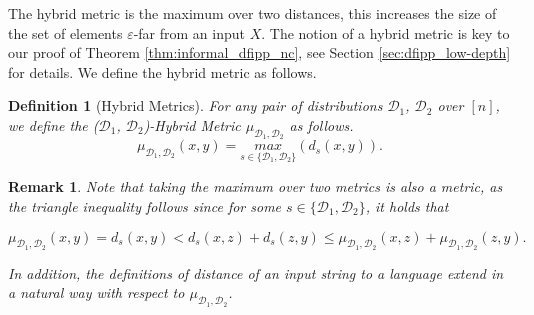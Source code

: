 \documentclass[10pt,a4paper]{article}
\newtheorem{definition}{Definition}[section]
\newtheorem{remark}{Remark}
\newcommand{\sD}{\mathcal{D}}
\begin{document}
The hybrid metric is the maximum over two distances, this increases the size of the set of elements $\varepsilon$-far from an input $X$. The notion of a hybrid metric is key to our proof of Theorem \ref{thm:informal_dfipp_nc}, see Section \ref{sec:dfipp_low-depth} for details. We define the hybrid metric as follows.

\begin{definition}[Hybrid Metrics]
    For any pair of distributions $\mathcal{D}_{1}$, $\mathcal{D}_{2}$ over $[n]$, we define the \textit{($\mathcal{D}_{1}$, $\mathcal{D}_{2}$)-Hybrid Metric} $\mu_{\mathcal{D}_{1},\mathcal{D}_{2}}$ as follows. 
\begin{equation*}
    \mu_{\mathcal{D}_{1}, \mathcal{D}_{2}}(x,y)=\underset{s\in\{\mathcal{D}_{1}, \mathcal{D}_{2}\}}{max}(d_{s}(x,y)).
\end{equation*}
\end{definition}

\begin{remark}
Note that taking the maximum over two metrics is also a metric, as the triangle inequality follows since for some $s\in \{\mathcal{D}_{1}, \mathcal{D}_{2}\}$, it holds that

\begin{equation*}
    \mu_{\mathcal{D}_{1}, \mathcal{D}_{2}}(x,y)=d_{s}(x,y)<d_{s}(x,z)+d_{s}(z,y)\leq \mu_{\mathcal{D}_{1}, \mathcal{D}_{2}}(x,z)+\mu_{\mathcal{D}_{1}, \mathcal{D}_{2}}(z,y).
\end{equation*}

In addition, the definitions of distance of an input string to a language extend in a natural way with respect to $\mu_{\sD_1,\sD_2}$.
\end{remark}
\end{document}
